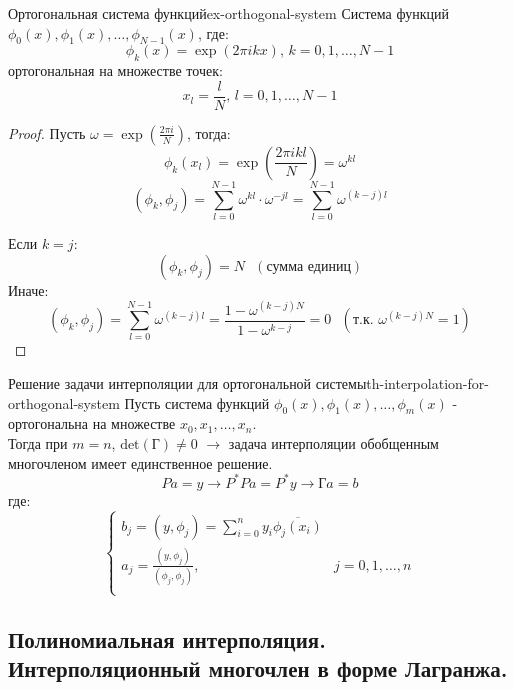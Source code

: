 \documentclass[14pt]{extarticle}
\begin{document}
    \clearpage
    \begin{example}{Ортогональная система функций}{ex-orthogonal-system}
        Система функций $\phi_{0}(x), \phi_{1}(x), \ldots, \phi_{N-1}(x)$, где:
        $$\phi_{k}(x) = \exp(2\pi ikx) \text{, } k = 0, 1, \ldots, N-1$$
        ортогональная на множестве точек:
        $$x_{l} = \frac{l}{N} \text{, } l=0, 1, \ldots, N-1$$
    
        \begin{proof}
            Пусть $\omega = \exp(\frac{2\pi i}{N})$, тогда:
            $$\phi_{k}(x_{l}) = \exp(\frac{2\pi ikl}{N}) = \omega^{kl}$$
            $$(\phi_{k}, \phi_{j}) = \sum_{l = 0}^{N-1} \omega^{kl} \cdot \omega^{-jl} = \sum_{l = 0}^{N-1} \omega^{(k - j)l}$$
            
            Если $k = j$:
            $$(\phi_{k}, \phi_{j}) = N \text{ } (\text{сумма единиц})$$
            Иначе:
            $$(\phi_{k}, \phi_{j}) = \sum_{l = 0}^{N - 1} \omega^{(k - j)l} = \frac{1 - \omega^{(k - j)N}}{1 - \omega^{k - j}} = 0 \text{ } (\text{т.к. } \omega^{(k - j)N} = 1)$$
        \end{proof}
    \end{example}

    \begin{theorem}{Решение задачи интерполяции для ортогональной системы}{th-interpolation-for-orthogonal-system}
        Пусть система функций $\phi_{0}(x), \phi_{1}(x), \ldots, \phi_{m}(x)$ - ортогональна на множестве $x_{0}, x_{1}, \ldots, x_{n}$.\\
        Тогда при $m = n$, $\text{det}(\text{Г}) \neq 0$ $\rightarrow$ задача интерполяции обобщенным многочленом имеет единственное решение.
        $$Pa = y \rightarrow P^{*}Pa = P^{*}y \rightarrow \text{Г}a = b$$
        где: 
        $$
        \begin{cases}
            b_{j} = (y, \phi_{j}) = \sum_{i = 0}^{n} y_{i}\overline{\phi_{j}(x_{i})}\\
            a_{j} = \frac{(y, \phi_{j})}{(\phi_{j}, \phi_{j})}, & j = 0, 1, \ldots, n \\
        \end{cases}
        $$
    \end{theorem}

\clearpage
\subsection{Полиномиальная интерполяция. Интерполяционный многочлен в форме Лагранжа.}
\end{document}
